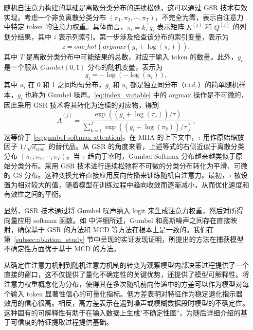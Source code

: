 \documentclass[UTF8,journal,twoside,web]{ieeecolor}
\newcommand{\newtext}[1]{{\leavevmode\color{blue}#1}}
\begin{document}
随机自注意力构建的基础是离散分类分布的连续松弛，这可以通过 GSR 技术有效实现。考虑一个非负离散分类分布 $(\pi_{1},\pi_{2},\cdots,\pi_{T})$，不完全为零，表示自注意力中特定 token 的注意力权重。具体而言，$\pi_{i}=k_{i}^\top q_{i}$ 表示矩阵 $K^{(j)}$ 和 $Q^{(j)}$ 的列划分结果，其中 $i$ 表示列索引。第一步涉及检查该分布的索引变量，表示为
\begin{equation}
z=one\_hot(argmax(g_{i}+\log(\pi_{i}))),
\label{eq:index_variable}
\end{equation}%
其中 $T$ 是离散分类分布中可能结果的总数，对应于输入 token 的数量。此外，$g_i$ 是一个服从 $Gumbel(0,1)$ 分布的随机变量，表示为
\begin{equation}
g_{i}=-\log(-\log(u_{i})),
\label{eq:gumbel_noise}
\end{equation}%
其中 $u_i$ 在 0 和 1 之间均匀分布，$g_i$ 和 $u_i$ 都是独立同分布（i.i.d.）的简单随机样本，$g_i$ 也称为 Gumbel 噪声。\eqref{eq:index_variable} 中的 argmax 操作是不可微的，因此采用 GSR 技术将其转化为连续的对应物，得到
\begin{equation}
\tilde{A}^{(j)}=\frac{\exp((g_{i}+\log(\pi_{i}))/\tau)}{\sum\nolimits_{k=1}^{T}\exp((g_{i}+\log(\pi_{k}))/\tau)},
\label{eq:gsr_relaxation}
\end{equation}%
这等价于 \eqref{eq:gumbel-softmax-attention}。在 MHA 的上下文中，$\tau$ 用作原始缩放因子 $1 / \sqrt{d_{emb}}$ 的替代品。从 GSR 的角度来看，上述等式的右侧近似于离散分类分布 $(\pi_{1}, \pi_{2}, \cdots, \pi_{T})$。当 $\tau$ 趋向于零时，Gumbel-Softmax 分布越来越类似于原始分类分布。采用 GSR 技术进行连续松弛将不可微的分类分布转化为平滑、可微的 GS 分布。这种变换允许直接应用反向传播来训练随机自注意力。最初，$\tau$ 被设置为相对较大的值，随着模型在训练过程中趋向收敛而逐渐减小，从而优化速度和有效性之间的平衡。

显然，GSR 技术通过将 Gumbel 噪声纳入 logit 来生成注意力权重，然后对所得向量应用 softmax 函数。如\cite{potapczynski2020invertible} 中详细所述，Gumbel 和高斯噪声之间存在直接映射，确保基于 GSR 的方法和 MCD 等方法在根本上是一致的。我们在第~\ref{subsec:ablation_study} 节中呈现的实证发现证明，所提出的方法在捕获模型不确定性方面优于基于 MCD 的方法。

\newtext{从确定性注意力机制到随机注意力机制的转变为观察模型内部决策过程提供了一个直接的窗口，这不仅提供了量化不确定性的关键优势，还提供了模型可解释性。将注意力权重概念化为分布，使得其在多次随机前向传递中的方差可以作为模型对每个输入 token 显著性信心的可量化指标。低方差表明对特征作为稳定退化指示器效用的信心很高。相反，高方差表示在遇到噪声或模糊数据段时模型的不确定性。这种固有的可解释性有助于在输入数据上生成"不确定性图"，为随后详细介绍的基于可信度的特征提取过程提供基础。}
\end{document}
